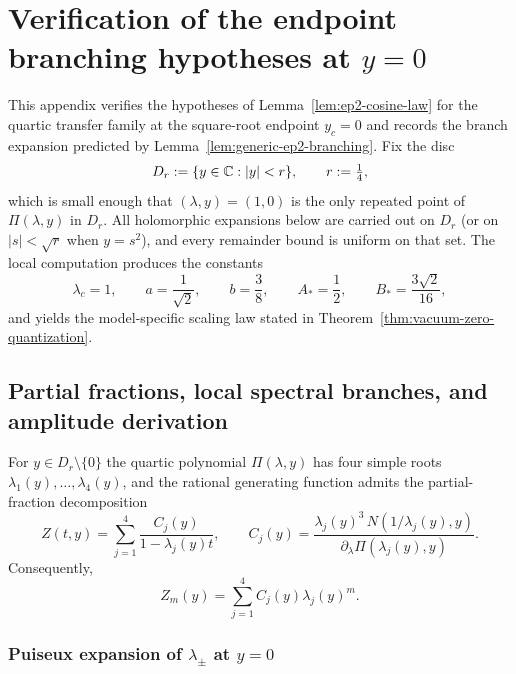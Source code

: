 \section{Verification of the endpoint branching hypotheses at \texorpdfstring{\(y=0\)}{y=0}}\label{app:vacuum-edge}

This appendix verifies the hypotheses of Lemma~\ref{lem:ep2-cosine-law} for the quartic transfer family at the square-root endpoint $y_c=0$ and records the branch expansion predicted by Lemma~\ref{lem:generic-ep2-branching}.
Fix the disc
\[
D_r:=\{y\in\mathbb{C}:\left\lvert y\right\rvert<r\},\qquad r:=\tfrac14,
\]
which is small enough that $(\lambda,y)=(1,0)$ is the only repeated point of $\Pi(\lambda,y)$ in $D_r$.
All holomorphic expansions below are carried out on $D_r$ (or on $|s|<\sqrt{r}$ when $y=s^2$), and every remainder bound is uniform on that set.
The local computation produces the constants
\[
\lambda_c=1,\qquad
a=\frac{1}{\sqrt2},\qquad
b=\frac38,\qquad
A_*=\frac12,\qquad
B_*=\frac{3\sqrt2}{16},
\]
and yields the model-specific scaling law stated in Theorem~\ref{thm:vacuum-zero-quantization}.

\subsection{Partial fractions, local spectral branches, and amplitude derivation}

For $y\in D_r\setminus\{0\}$ the quartic polynomial $\Pi(\lambda,y)$ has four simple roots $\lambda_1(y),\dots,\lambda_4(y)$, and the rational generating function admits the partial-fraction decomposition
\begin{equation}\label{eq:partial-fractions}
Z(t,y)=\sum_{j=1}^4 \frac{C_j(y)}{1-\lambda_j(y)t},
\qquad
C_j(y)=\frac{\lambda_j(y)^3\,N(1/\lambda_j(y),y)}{\partial_\lambda\Pi(\lambda_j(y),y)}.
\end{equation}
Consequently,
\begin{equation}\label{eq:spectral-decomposition}
Z_m(y)=\sum_{j=1}^4 C_j(y)\lambda_j(y)^m.
\end{equation}

\subsubsection*{Puiseux expansion of \texorpdfstring{$\lambda_\pm$}{lambda\_pm} at \texorpdfstring{$y=0$}{y=0}}

